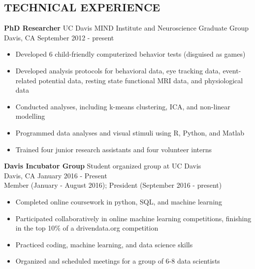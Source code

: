 \documentclass[line,margin,10pt]{res}
\begin{document}
\begin{resume}



\section{TECHNICAL EXPERIENCE}
\textbf{PhD Researcher} \hfill UC Davis MIND Institute and Neuroscience Graduate Group\\ 
Davis, CA \hfill September 2012 - present
\begin{itemize} \itemsep -2pt
\item Developed 6 child-friendly computerized behavior tests (disguised as games)
\item Developed analysis protocols for behavioral data, eye tracking data, event-related potential data, resting state functional MRI data, and physiological data
\item Conducted analyses, including k-means clustering, ICA, and non-linear modelling
\item Programmed data analyses and visual stimuli using R, Python, and Matlab
\item Trained four junior research assistants and four volunteer interns
\end{itemize}

\textbf{Davis Incubator Group} \hfill Student organized group at UC Davis\\
Davis, CA \hfill January 2016 - Present\\
Member (January - August 2016); President (September 2016 - present)
\begin{itemize} \itemsep -2pt
\item Completed online coursework in python, SQL, and machine learning
\item Participated collaboratively in online machine learning competitions, finishing in the top 10\% of a drivendata.org competition
\item Practiced coding, machine learning, and data science skills
\item Organized and scheduled meetings for a group of 6-8 data scientists
\end{itemize}


\end{resume}
\end{document}
